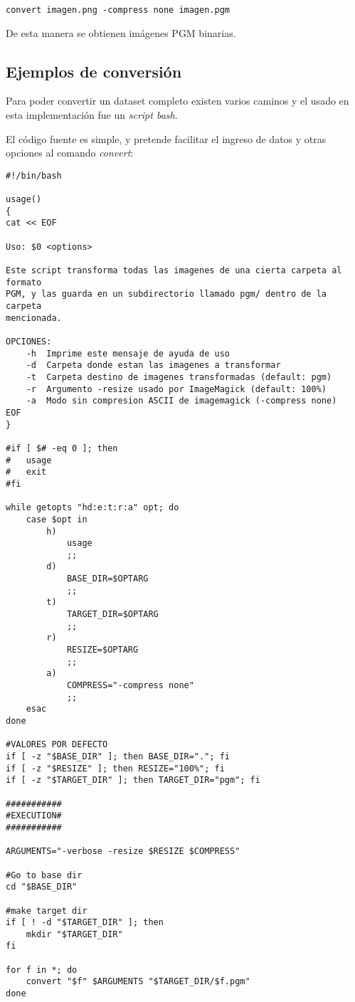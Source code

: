 \begin{verbatim}
convert imagen.png -compress none imagen.pgm
\end{verbatim}

De esta manera se obtienen imágenes PGM binarias.

\subsection{Ejemplos de conversión}
\label{ch:implementacion:sec:ejemplosdeconversion}

Para poder convertir un dataset completo existen varios caminos y el usado en esta implementación fue un \emph{script bash}.

El código fuente es simple, y pretende facilitar el ingreso de datos y otras opciones al comando \emph{convert}:

\begin{scriptsize}
\begin{verbatim}
#!/bin/bash

usage()
{
cat << EOF

Uso: $0 <options>

Este script transforma todas las imagenes de una cierta carpeta al formato
PGM, y las guarda en un subdirectorio llamado pgm/ dentro de la carpeta
mencionada.

OPCIONES:
    -h  Imprime este mensaje de ayuda de uso
    -d  Carpeta donde estan las imagenes a transformar
    -t  Carpeta destino de imagenes transformadas (default: pgm)
    -r  Argumento -resize usado por ImageMagick (default: 100%)
    -a  Modo sin compresion ASCII de imagemagick (-compress none)
EOF
}

#if [ $# -eq 0 ]; then
#   usage
#   exit
#fi

while getopts "hd:e:t:r:a" opt; do
    case $opt in
        h)
            usage
            ;;
        d)
            BASE_DIR=$OPTARG
            ;;
        t)
            TARGET_DIR=$OPTARG
            ;;
        r)
            RESIZE=$OPTARG
            ;;
        a)
            COMPRESS="-compress none"
            ;;
    esac
done

#VALORES POR DEFECTO
if [ -z "$BASE_DIR" ]; then BASE_DIR="."; fi
if [ -z "$RESIZE" ]; then RESIZE="100%"; fi
if [ -z "$TARGET_DIR" ]; then TARGET_DIR="pgm"; fi

###########
#EXECUTION#
###########

ARGUMENTS="-verbose -resize $RESIZE $COMPRESS"

#Go to base dir
cd "$BASE_DIR"

#make target dir
if [ ! -d "$TARGET_DIR" ]; then
    mkdir "$TARGET_DIR"
fi

for f in *; do
    convert "$f" $ARGUMENTS "$TARGET_DIR/$f.pgm"
done
\end{verbatim}
\end{scriptsize}


